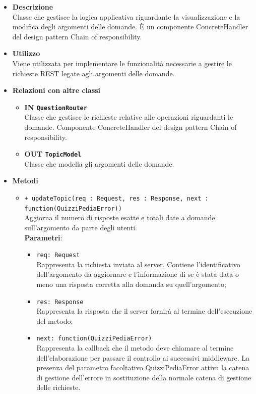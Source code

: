 \begin{itemize}
	\item \textbf{Descrizione} \\
	Classe che gestisce la logica applicativa riguardante la visualizzazione e la modifica degli argomenti delle domande. È un componente ConcreteHandler del design pattern Chain of responsibility.
	\item \textbf{Utilizzo} \\
	Viene utilizzata per implementare le funzionalità necessarie a gestire le richieste REST legate agli argomenti delle domande.
	\item \textbf{Relazioni con altre classi}
		\begin{itemize}
			\item \textbf{IN \texttt{QuestionRouter}} \\
			Classe che gestisce le richieste relative alle operazioni riguardanti le domande. Componente ConcreteHandler del design pattern Chain of responsibility.
			\item \textbf{OUT \texttt{TopicModel}} \\
			Classe che modella gli argomenti delle domande.
		\end{itemize}
	\item \textbf{Metodi}
		\begin{itemize}
			\item \texttt{+ updateTopic(req : Request, res : Response, next : function(QuizziPediaError))} \\
			Aggiorna il numero di risposte esatte e totali date a domande sull'argomento da parte degli utenti. \\
			\textbf{Parametri}:
			\begin{itemize}
			\item \texttt{req: Request} \\
			Rappresenta la richiesta inviata al server. Contiene l'identificativo dell'argomento da aggiornare e l'informazione di se è stata data o meno una risposta corretta alla domanda su quell'argomento;
			\item \texttt{res: Response} \\
			Rappresenta la risposta che il server fornirà al termine dell'esecuzione del metodo;
			\item \texttt{next: function(QuizziPediaError)} \\
			Rappresenta la callback che il metodo deve chiamare al termine dell'elaborazione per passare il controllo ai successivi middleware. La presenza del parametro facoltativo QuizziPediaError attiva la catena di gestione dell'errore in sostituzione della normale catena di gestione delle richieste.

\end{itemize}
\end{itemize}
\end{itemize}
